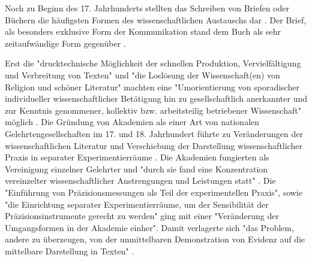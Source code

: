 Noch zu Beginn des 17. Jahrhunderts stellten das Schreiben von Briefen oder Büchern die häufigsten Formen des wissenschaftlichen Austauschs dar \cite{porter_1964_scientific}. Der Brief, als besonders exklusive Form der Kommunikation stand dem Buch als sehr zeitaufwändige Form gegenüber \cite{fecher_hiig_2014}.

Erst die "drucktechnische Möglichkeit der schnellen Produktion, Vervielfältigung und Verbreitung von Texten" und "die Loslösung der Wissenschaft(en) von Religion und schöner Literatur" machten eine "Umorientierung von sporadischer individueller wissenschaftlicher Betätigung hin zu gesellschaftlich anerkannter und zur Kenntnis genommener, kollektiv bzw. arbeitsteilig betriebener Wissenschaft" möglich \cite{graefen2007_wissenschaftliche_artikel}. Die Gründung von Akademien als einer Art von nationalen Gelehrtengesellschaften im 17. und 18. Jahrhundert führte zu Veränderungen der wissenschaftlichen Literatur \cite{graefen2007_wissenschaftliche_artikel} und Verschiebung der Darstellung wissenschaftlicher Praxis in separater Experimentierräume \cite{weingart_2005_wissenschaft}. Die Akademien fungierten als Vereinigung einzelner Gelehrter und "durch sie fand eine Konzentration vereinzelter wissenschaftlicher Anstrengungen und Leistungen statt" \cite{graefen2007_wissenschaftliche_artikel}. Die "Einführung von Präzisionsmessungen als Teil der experimentellen Praxis", sowie "die Einrichtung separater Experimentierräume, um der Sensibilität der Präzisionsinstrumente gerecht zu werden" ging mit einer "Veränderung der Umgangsformen in der Akademie einher". Damit verlagerte sich "das Problem, andere zu überzeugen, von der unmittelbaren Demonstration von Evidenz auf die mittelbare Darstellung in Texten" \cite{weingart_2005_wissenschaft}.

